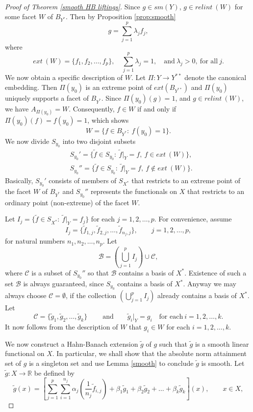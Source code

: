 \documentclass[10pt,a4paper]{amsart}
\begin{document}
\begin{proof}[Proof of Theorem \ref{smooth HB liftings}]
\medskip


\noindent Since $g\in sm(Y)$, $g\in relint~(W)$ for some facet $W$ of $B_{Y^*}$. Then by Proposition \ref{prop:smooth}
\[
g = \sum_{j=1}^p\lambda_jf_j,
\]
where 
\[
ext~(W)=\{f_1,f_2,\dots,f_p\}, \quad \sum_{j=1}^p\lambda_j=1, \quad \text{and}~ \lambda_j>0, ~\text{for all}~j.
\]
We now obtain a specific description of $W$. Let $\Pi:Y\to Y^{**}$ denote the canonical embedding. Then $\Pi(y_0)$ is an extreme point of $ext(B_{Y^{**}})$ and $\Pi(y_0)$ uniquely supports a facet of $B_{Y^*}$. Since $\Pi(y_0)(g)=1$, and $g\in relint~(W)$, we have $A_{\Pi(y_0)}=W$. Consequently, $f\in W$ if and only if $\Pi(y_0)(f)=f(y_0)=1$, which shows
\[
W=\{f\in B_{Y^*}:~f(y_0)=1\}.
\]
We now divide $S_{y_0}$ into two disjoint subsets
\begin{align*}
& S_{y_0}'=\{\widetilde{f}\in S_{y_0}:~\widetilde{f}|_Y=f,~f\in ext~(W)\},\\
& S_{y_0}''=\{\widetilde{f}\in S_{y_0}:~\widetilde{f}|_Y=f,~f\notin ext~(W)\}.
\end{align*}
Basically, $S_{y_0}'$ consists of members of $S_{X^*}$ that restricts to an extreme point of the facet $W$ of $B_{Y^*}$ and $S_{y_0}''$ represents the functionals on $X$ that restricts to an ordinary point (non-extreme) of the facet $W$.


\medskip



\noindent Let $I_j=\{\widetilde{f}\in S_{X^*}:~\widetilde{f}|_Y=f_j\}$ for each $j=1,2,\dots,p$. For convenience, assume
\[
I_j=\{\widetilde{f}_{1,j},\widetilde{f}_{2,j},\dots, \widetilde{f}_{n_j,j}\}, \qquad j=1,2,\dots,p,
\]
for natural numbers $n_1,n_2,\dots,n_p$. Let
\[
\mathcal{B}=(\bigcup_{j=1}^p I_j) \cup \mathcal{C},
\]
where $\mathcal{C}$ is a subset of $S_{y_0}''$ so that $\mathcal{B}$ contains a basis of $X^*$. Existence of such a set $\mathcal{B}$ is always guaranteed, since $S_{y_0}$ contains a basis of $X^*$. Anyway we may always choose $\mathcal{C} = \emptyset$, if the collection $(\bigcup_{j=1}^p I_j)$ already contains a basis of $X^*$. Let
\[
\mathcal{C}=\{\widetilde{g}_1,\widetilde{g}_2,\dots, \widetilde{g}_k\}~\qquad \text{and}  \qquad \widetilde{g}_i|_Y=g_i \quad \text{for each}~i=1,2,\dots,k.
\]
It now follows from the description of $W$ that $g_i\in W$ for each $i=1,2,\dots,k$.


\medskip



\noindent We now construct a Hahn-Banach extension $\widetilde{g}$ of $g$ such that $\widetilde{g}$ is a smooth linear functional on $X$. In particular, we shall show that the absolute norm attainment set of $g$ is a singleton set and use Lemma \ref{smooth} to conclude $\widetilde{g}$ is smooth. Let $\widetilde{g}:X\to \mathbb{R}$ be defined by
\[
\widetilde{g}(x)= \left[\sum_{j=1}^p\sum_{i=1}^{n_j}\alpha_j(\frac{1}{n_j}\widetilde{f}_{i,j})+\beta_{1}\widetilde{g}_{1}+\beta_{2}\widetilde{g}_{2}+\dots+\beta_{k}\widetilde{g}_k\right](x), \qquad x\in X,
\]



\end{proof}
\end{document}
